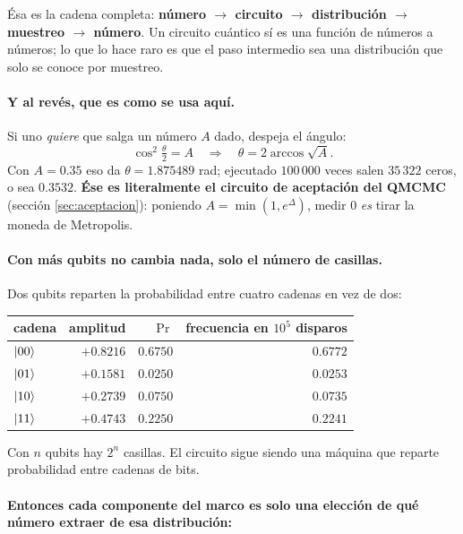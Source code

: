 \documentclass[11pt,a4paper]{article}
\begin{document}
\noindent
Ésa es la cadena completa: \textbf{número $\to$ circuito $\to$ distribución
$\to$ muestreo $\to$ número}. Un circuito cuántico sí es una función de
números a números; lo que lo hace raro es que el paso intermedio sea una
distribución que solo se conoce por muestreo.

\paragraph{Y al revés, que es como se usa aquí.} Si uno \emph{quiere} que
salga un número $A$ dado, despeja el ángulo:
\begin{equation*}
  \cos^2\tfrac{\theta}{2} = A
  \quad\Longrightarrow\quad
  \theta = 2\arccos\sqrt{A}.
\end{equation*}
Con $A = 0.35$ eso da $\theta = 1.875489$ rad; ejecutado $100\,000$ veces
salen $35\,322$ ceros, o sea $0.3532$. \textbf{Ése es literalmente el
circuito de aceptación del QMCMC} (sección \ref{sec:aceptacion}): poniendo
$A = \min(1, e^{\Delta})$, medir $0$ \emph{es} tirar la moneda de Metropolis.

\paragraph{Con más qubits no cambia nada, solo el número de casillas.} Dos
qubits reparten la probabilidad entre cuatro cadenas en vez de dos:

\begin{center}
\small
\begin{tabular}{lrrr}
\toprule
cadena & amplitud & $\Pr$ & frecuencia en $10^5$ disparos \\
\midrule
$\ket{00}$ & $+0.8216$ & $0.6750$ & $0.6772$ \\
$\ket{01}$ & $+0.1581$ & $0.0250$ & $0.0253$ \\
$\ket{10}$ & $+0.2739$ & $0.0750$ & $0.0735$ \\
$\ket{11}$ & $+0.4743$ & $0.2250$ & $0.2241$ \\
\bottomrule
\end{tabular}
\end{center}

\noindent
Con $n$ qubits hay $2^n$ casillas. El circuito sigue siendo una máquina que
reparte probabilidad entre cadenas de bits.

\paragraph{Entonces cada componente del marco es solo una elección de qué
número extraer de esa distribución:}
\end{document}
